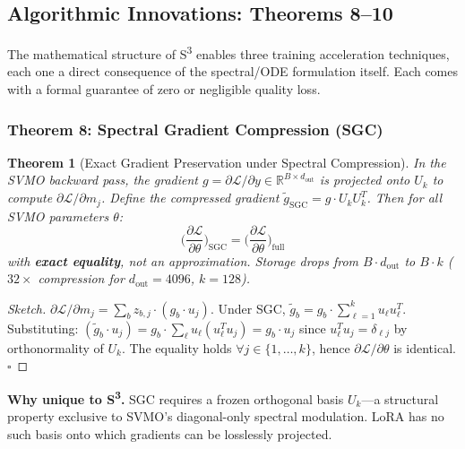 \documentclass{scpe}
\newtheorem{theorem}{Theorem}[section]
\newcommand{\RR}{\mathbb{R}}
\begin{document}
\subsection{Algorithmic Innovations: Theorems 8--10}

The mathematical structure of S\textsuperscript{3} enables three training acceleration techniques, each one a direct consequence of the spectral/ODE formulation itself. Each comes with a formal guarantee of zero or negligible quality loss.

\subsubsection{Theorem 8: Spectral Gradient Compression (SGC)}

\begin{theorem}[Exact Gradient Preservation under Spectral Compression]
\label{thm:sgc}
In the SVMO backward pass, the gradient $g = \partial\mathcal{L}/\partial y \in \RR^{B \times d_{\text{out}}}$ is projected onto $U_k$ to compute $\partial\mathcal{L}/\partial m_j$. Define the compressed gradient $\tilde{g}_{\text{SGC}} = g \cdot U_k U_k^T$. Then for all SVMO parameters $\theta$:
\begin{equation}
\Big(\frac{\partial\mathcal{L}}{\partial\theta}\Big)_{\text{SGC}} = \Big(\frac{\partial\mathcal{L}}{\partial\theta}\Big)_{\text{full}}
\end{equation}
with \textbf{exact equality}, not an approximation. Storage drops from $B \cdot d_{\text{out}}$ to $B \cdot k$ ($32\times$ compression for $d_{\text{out}}=4096$, $k=128$).
\end{theorem}

\begin{proof}[Sketch]
$\partial\mathcal{L}/\partial m_j = \sum_b z_{b,j} \cdot (g_b \cdot u_j)$. Under SGC, $\tilde{g}_b = g_b \cdot \sum_{\ell=1}^k u_\ell u_\ell^T$. Substituting: $(\tilde{g}_b \cdot u_j) = g_b \cdot \sum_\ell u_\ell (u_\ell^T u_j) = g_b \cdot u_j$ since $u_\ell^T u_j = \delta_{\ell j}$ by orthonormality of $U_k$. The equality holds $\forall j \in \{1,\dots,k\}$, hence $\partial\mathcal{L}/\partial\theta$ is identical. $\square$
\end{proof}

\textbf{Why unique to S\textsuperscript{3}.} SGC requires a frozen orthogonal basis $U_k$—a structural property exclusive to SVMO's diagonal-only spectral modulation. LoRA has no such basis onto which gradients can be losslessly projected.
\end{document}
